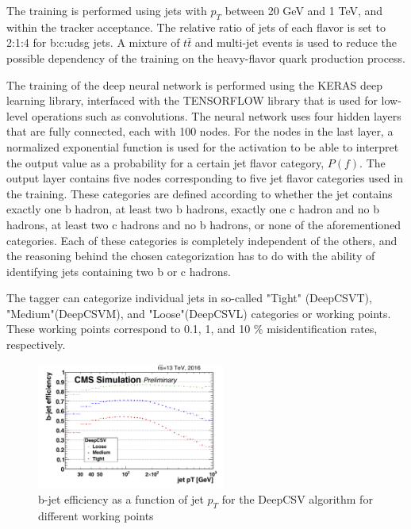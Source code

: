 The training is performed using jets with $p_{T}$ between 20 GeV and 1 TeV, and within the tracker acceptance. The relative ratio of jets of each flavor is set to 2:1:4 for b:c:udsg jets. A mixture of $t\bar{t}$ and multi-jet events is used to reduce the possible dependency of the training on the heavy-flavor quark production process.

The training of the deep neural network is performed using the KERAS\cite{chollet2015keras} deep learning library, interfaced with the TENSORFLOW\cite{tensorflow2015-whitepaper} library that is used for low-level operations such as convolutions. The neural network uses four hidden layers that are fully connected, each with 100 nodes. For the nodes in the last layer, a normalized exponential function is used for the activation to be able to interpret the output value as a probability for a certain jet flavor category, $P(f)$. The output layer contains five nodes corresponding to five jet flavor categories used in the training. These categories are defined according to whether the jet contains exactly one b hadron, at least two b hadrons, exactly one c hadron and no b hadrons, at least two c hadrons and no b hadrons, or none of the aforementioned categories. Each of these categories is completely independent of the others, and the reasoning behind the chosen categorization has to do with the ability of identifying jets containing two b or c hadrons. 

The tagger can categorize individual jets in so-called "Tight" (DeepCSVT), "Medium"(DeepCSVM), and "Loose"(DeepCSVL) categories or working points. These working points correspond to 0.1, 1, and 10 $\%$ misidentification rates, respectively.

\begin{figure}[h]
 	\centering
 	\includegraphics[width=0.55\textwidth]{figures/effvspt_b_deep.png}
 	\singlespace
 	\caption{b-jet efficiency as a function of jet $p_{T}$ for the DeepCSV algorithm for different working points\cite{Sirunyan_2018}}
 	  	\label{fig:deepcsv}
 \end{figure}

